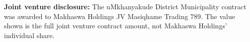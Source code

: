 \documentclass[a4paper,landscape,10pt]{article}
\begin{document}
\endgroup

\vspace{0.4cm}

{\footnotesize\color{MHMuted}
\textbf{Joint venture disclosure:}
The uMkhanyakude District Municipality contract
was awarded to Makhaswa Holdings JV Masiqhame
Trading 789. The value shown is the full joint
venture contract amount, not Makhaswa Holdings'
individual share.
}
\end{document}
